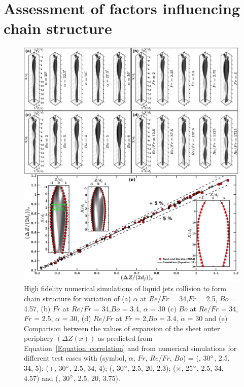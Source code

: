 \documentclass{jfm}
\begin{document}
\section{Assessment of factors influencing chain structure}
\begin{figure}
	\centering
	\includegraphics[width=\linewidth]{Figure6}
	\caption{High fidelity numerical simulations of liquid jets collision to form chain structure for variation of (a) $\alpha$ at $Re/Fr$ = 34,$Fr$ = 2.5, $Bo$ = 4.57, (b) $Fr$ at $Re/Fr$ = 34,$Bo$ = 3.4, $\alpha$ =  30 (c) $Bo$ at $Re/Fr$ = 34,$Fr$ = 2.5, $\alpha$ = 30, (d)  $Re/Fr$ at $Fr$ = 2,$Bo$ = 3.4, $\alpha$ = 30 and (e) Comparison between the values of expansion of the sheet outer periphery $\left(\Delta Z(x)\right)$ as predicted from Equation~\ref{Equation::correlation} and from numerical simulations for different test cases with (symbol, $\alpha$, $Fr$, $Re/Fr$, $Bo$) = (\protect\MarkerSquareRed, 30$\degree$, 2.5, 34, 5); (+, 30$\degree$, 2.5, 34, 4); (\protect \MarkerDiamondBlack, 30$\degree$, 2.5, 20, 2.3); ($\times$, 25$\degree$, 2.5, 34, 4.57) and (\protect \MarkerCircleRed, 30$\degree$, 2.5, 20, 3.75).}
	\label{Figure::phaseContours}
\end{figure}
\end{document}
